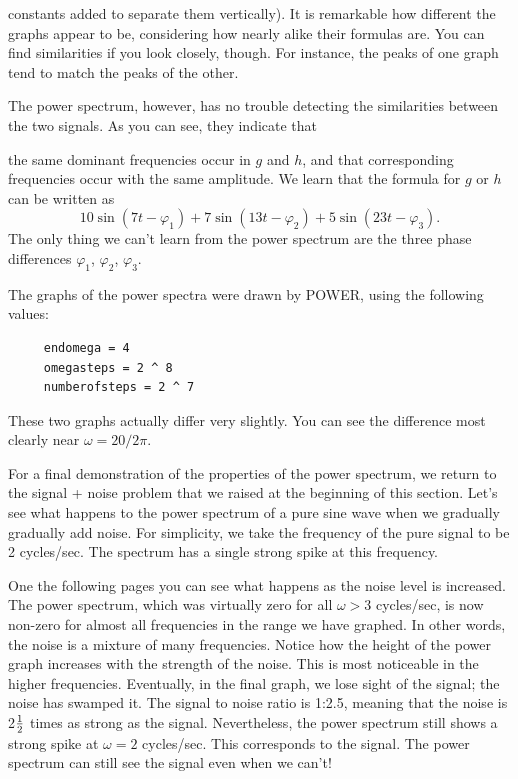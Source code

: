 {{{{\vspace{20pt}
\noindent
constants added to separate them vertically).  It is remarkable how different the graphs appear to be, considering how nearly alike their formulas are.  You can find similarities if you look closely, though.  For instance, the peaks of one graph tend to match the peaks of the other.

	The power spectrum, however, has no trouble detecting the similarities between the two signals.  As you can see, they indicate that    
\linebreak
\vspace{90pt}


\newpage

\noindent
the same dominant frequencies occur in $g$ and $h$, and that corresponding frequencies occur with the same amplitude.  We learn that the formula for $g$ or $h$ can be written as
	\[
10\sin(7t - \varphi_1) + 7\sin(13t - \varphi_2) + 
		5\sin(23t - \varphi_3).
\]
The only thing we can't learn from the power spectrum are the three phase differences $\varphi_1$,  $\varphi_2$, $\varphi_3$.

	The graphs of the power spectra were drawn by POWER, using the following values:
	\begin{verbatim} 
     endomega = 4
     omegasteps = 2 ^ 8
     numberofsteps = 2 ^ 7
	\end{verbatim}
These two graphs actually differ very slightly.  You can see the difference most clearly near $\omega = 20/2\pi$.
\medskip

	For a final demonstration of the properties of the 
power spectrum, we return to the signal + noise problem that we raised at the beginning of this section.  Let's see what happens to the power spectrum of a pure sine wave when we gradually gradually add noise.  For simplicity, we take the frequency of the pure signal to be 2 cycles/sec.  The spectrum has a single strong spike at this frequency.
\vspace{185pt}


\vspace{25pt}

	One the following pages you can see what happens as the noise level is increased. The power spectrum, which was virtually zero for all $\omega > 3$ cycles/sec, is now non-zero for almost all frequencies in the range we have graphed.  
In other words, the noise is a mixture of many frequencies.  Notice how the height of the power graph increases with the strength of the noise.  This is most noticeable in the higher frequencies.  Eventually, in the final graph, we lose sight of the signal; the noise has swamped it.  The signal to noise ratio is 1:2.5, meaning that the noise is 2$1 \over 2$ times as strong as the signal.  Nevertheless, the power spectrum still shows a strong spike at $\omega = 2$ cycles/sec.  This corresponds to the signal.  The power spectrum can still see the signal even when we can't! 	
\vspace{180pt}

}}}}
